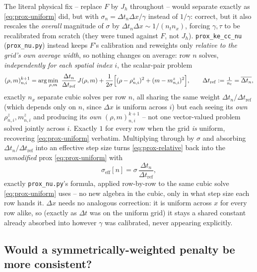 \documentclass[11pt]{article}
\newcommand{\dt}{\Delta t}
\newcommand{\dx}{\Delta x}
\newcommand{\code}[1]{\texttt{#1}}
\begin{document}
The literal physical fix -- replace $F$ by $J_h$ throughout -- would separate exactly as
\eqref{eq:prox-uniform} did, but with $\sigma_n = \dt_n\dx/\gamma$ instead of $1/\gamma$: correct,
but it also rescales the \emph{overall} magnitude of $\sigma$ by $\dt_n\dx\sim1/(n_tn_x)$, forcing
$\gamma,\tau$ to be recalibrated from scratch (they were tuned against $F$, not $J_h$).
\code{prox\_ke\_cc\_nu} (\code{prox\_nu.py}) instead keeps $F$'s calibration and reweights only
\emph{relative to the grid's own average width}, so nothing changes on average: row $n$ solves,
\emph{independently for each spatial index $i$}, the scalar-pair problem
\begin{equation}
  \label{eq:prox-relative}
  (\rho,m)^{k+1}_{n,i} = \arg\min_{\rho,m}\ \frac{\dt_n}{\dt_\mathrm{ref}}\,J(\rho,m)
  + \frac{1}{2\sigma}\Bigl[(\rho-\rho^z_{n,i})^2+(m-m^z_{n,i})^2\Bigr],
  \qquad \dt_\mathrm{ref} := \tfrac1{n_t} = \overline{\dt_n},
\end{equation}
exactly $n_x$ separate cubic solves per row $n$, all sharing the same weight $\dt_n/\dt_\mathrm{ref}$
(which depends only on $n$, since $\dx$ is uniform across $i$) but each seeing its \emph{own}
$\rho^z_{n,i},m^z_{n,i}$ and producing its \emph{own} $(\rho,m)^{k+1}_{n,i}$ -- not one vector-valued
problem solved jointly across $i$. Exactly $1$ for every row when the grid \emph{is} uniform, recovering \eqref{eq:prox-uniform}
verbatim. Multiplying through by $\sigma$ and absorbing $\dt_n/\dt_\mathrm{ref}$ into an effective
step size turns \eqref{eq:prox-relative} back into the \emph{unmodified} prox
\eqref{eq:prox-uniform} with
\begin{equation}
  \sigma_\mathrm{eff}[n] = \sigma\,\frac{\dt_n}{\dt_\mathrm{ref}},
\end{equation}
exactly \code{prox\_nu.py}'s formula, applied row-by-row to the same cubic solve
\eqref{eq:prox-uniform} uses -- no new algebra in the cubic, only in what step size each row
hands it. $\dx$ needs no analogous correction: it is uniform across $x$ for every row alike, so
(exactly as $\dt$ was on the uniform grid) it stays a shared constant already absorbed into
however $\gamma$ was calibrated, never appearing explicitly.

\subsection*{Would a symmetrically-weighted penalty be more consistent?}
\end{document}
